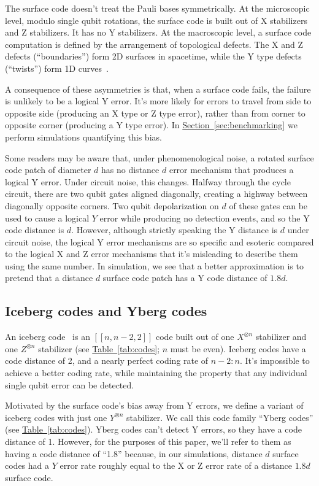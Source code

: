 \documentclass[onecolumn,unpublished,a4paper]{quantumarticle}
\theoremstyle{definition}
\theoremstyle{definition}
\theoremstyle{definition}
\renewcommand{\sec}[1]{\hyperref[sec:#1]{Section~\ref*{sec:#1}}}
\newcommand{\tab}[1]{\hyperref[tab:#1]{Table~\ref*{tab:#1}}}
\begin{document}
The surface code doesn't treat the Pauli bases symmetrically.
At the microscopic level, modulo single qubit rotations, the surface code is built out of X stabilizers and Z stabilizers.
It has no Y stabilizers.
At the macroscopic level, a surface code computation is defined by the arrangement of topological defects.
The X and Z defects (``boundaries'') form 2D surfaces in spacetime, while the Y type defects (``twists'') form 1D curves~\cite{brown2017surfacetwists,gidneyinplaceybasis2023}.

A consequence of these asymmetries is that, when a surface code fails, the failure is unlikely to be a logical Y error.
It's more likely for errors to travel from side to opposite side (producing an X type or Z type error), rather than from corner to opposite corner (producing a Y type error).
In \sec{benchmarking} we perform simulations quantifying this bias.

Some readers may be aware that, under phenomenological noise, a rotated surface code patch of diameter $d$ has no distance $d$ error mechanism that produces a logical Y error.
Under circuit noise, this changes.
Halfway through the cycle circuit, there are two qubit gates aligned diagonally, creating a highway between diagonally opposite corners.
Two qubit depolarization on $d$ of these gates can be used to cause a logical $Y$ error while producing no detection events, and so the Y code distance is $d$.
However, although strictly speaking the Y distance is $d$ under circuit noise, the logical Y error mechanisms are so specific and esoteric compared to the logical X and Z error mechanisms that it's misleading to describe them using the same number.
In simulation, we see that a better approximation is to pretend that a distance $d$ surface code patch has a Y code distance of $1.8d$.


\subsection{Iceberg codes and Yberg codes}

An iceberg code~\cite{steane1996simpleqec,self2022iceberg} is an $[[n, n-2, 2]]$ code built out of one $X^{\otimes n}$ stabilizer and one $Z^{\otimes n}$ stabilizer (see \tab{codes}; $n$ must be even).
Iceberg codes have a code distance of 2, and a nearly perfect coding rate of $n-2:n$.
It's impossible to achieve a better coding rate, while maintaining the property that any individual single qubit error can be detected.

Motivated by the surface code's bias away from Y errors, we define a variant of iceberg codes with just one $Y^{\otimes n}$ stabilizer.
We call this code family ``Yberg codes'' (see \tab{codes}).
Yberg codes can't detect Y errors, so they have a code distance of 1.
However, for the purposes of this paper, we'll refer to them as having a code distance of ``1.8'' because, in our simulations, distance $d$ surface codes had a $Y$ error rate roughly equal to the X or Z error rate of a distance $1.8d$ surface code.
\end{document}
